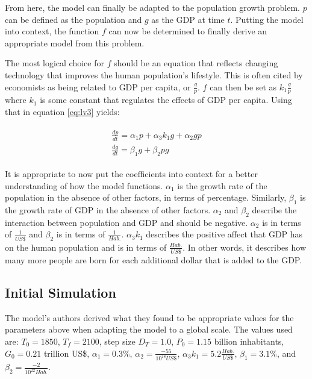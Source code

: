 \documentclass[a4paper]{article}
\begin{document}
From here, the model can finally be adapted to the population growth problem. $p$ can be defined as the population and $g$ as the GDP at time $t$. Putting the model into context, the function $f$ can now be determined to finally derive an appropriate model from this problem.

The most logical choice for $f$ should be an equation that reflects changing technology that improves the human population's lifestyle. This is often cited by economists as being related to GDP per capita, or $\frac{g}{p}$. $f$ can then be set as $k_1 \frac{g}{p}$ where $k_1$ is some constant that regulates the effects of GDP per capita. Using that in equation \ref{eq:lv3} yields:

\begin{align}
\begin{split}
\label{eq:lvfin}
	\frac{dp}{dt} = \alpha_1 p + \alpha_3 k_1 g + \alpha_2 g p \\
	\frac{dg}{dt} = \beta_1 g + \beta_2 p g
\end{split}
\end{align}

It is appropriate to now put the coefficients into context for a better understanding of how the model functions. $\alpha_1$ is the growth rate of the population in the absence of other factors, in terms of percentage. Similarly, $\beta_1$ is the growth rate of GDP in the absence of other factors. $\alpha_2$ and $\beta_2$ describe the interaction between population and GDP and should be negative. $\alpha_2$ is in terms of $\frac{1}{US\$}$ and $\beta_2$ is in terms of $\frac{1}{Hab.}$. $\alpha_3 k_1$ describes the positive affect that GDP has on the human population and is in terms of $\frac{Hab.}{US\$}$. In other words, it describes how many more people are born for each additional dollar that is added to the GDP. 

\subsection{Initial Simulation}

The model's authors derived what they found to be appropriate values for the parameters above when adapting the model to a global scale. The values used are: $T_0 = 1850$, $T_f = 2100$, step size $D_T = 1.0$, $P_0 = 1.15$ billion inhabitants, $G_0 = 0.21$ trillion US\$, $\alpha_1 = 0.3\%$, $\alpha_2 = \frac{-55}{10^{18} US\$}$, $\alpha_3 k_1 = 5.2 \frac{Hab.}{US \$}$, $\beta_1 = 3.1\%$, and $\beta_2 = \frac{-2}{10^{22} Hab.}$. 
\end{document}
